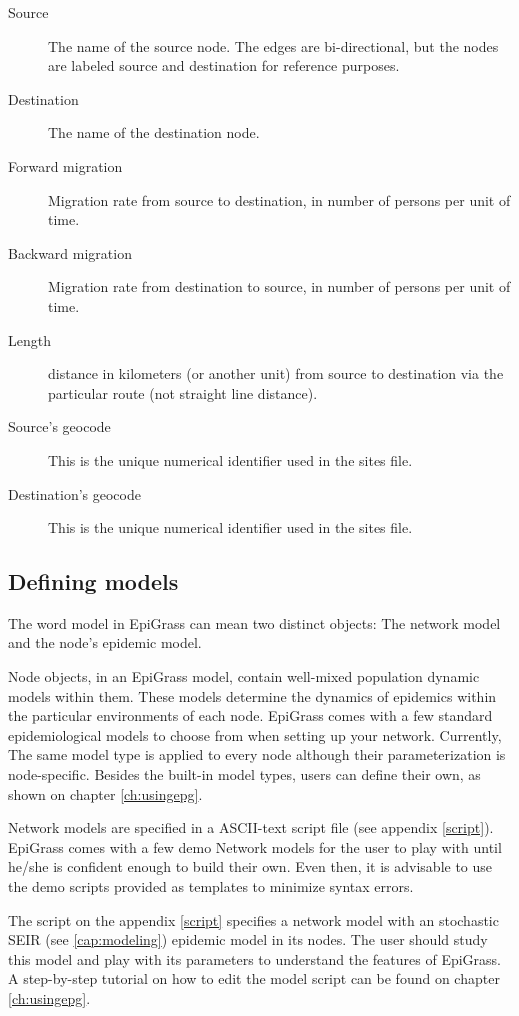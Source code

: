 \begin{description}
\item [Source] The name of the source node. The edges are bi-directional, but the nodes are labeled source and destination for reference purposes.
\item [Destination] The name of the destination node.
\item [Forward migration] Migration rate from source to destination, in number of persons per unit of time.
\item [Backward migration] Migration rate from destination to source, in number of persons per unit of time.
\item [Length] distance in kilometers (or another unit) from source to destination via the particular route (not straight line distance).
\item [Source's geocode] This is the unique numerical identifier used in the sites file.
\item [Destination's geocode] This is the unique numerical identifier used in the sites file.
 \end{description}



\subsection{Defining models}
The word model in EpiGrass can mean two distinct objects: The network model and the node's epidemic model.

Node objects, in an EpiGrass model, contain well-mixed population dynamic models within them. These models determine the dynamics of epidemics within the particular environments of each node. EpiGrass comes with a few standard epidemiological models to choose from when setting up your network. Currently, The same model type is applied to every node although their parameterization is node-specific. Besides the built-in model types, users can define their own, as shown on chapter \ref{ch:usingepg}.

Network models are specified in a ASCII-text script file (see appendix \ref{script}). EpiGrass comes with a few demo Network models for the user to play with until he/she is confident enough to build their own. Even then, it is advisable to use the demo scripts provided as templates to minimize syntax errors.

The script on the appendix \ref{script} specifies a network model with an stochastic SEIR (see \ref{cap:modeling}) epidemic model in its nodes. The user should study this model and play with its parameters to understand the features of EpiGrass. A step-by-step tutorial on how to edit the model script can be found on chapter \ref{ch:usingepg}.

